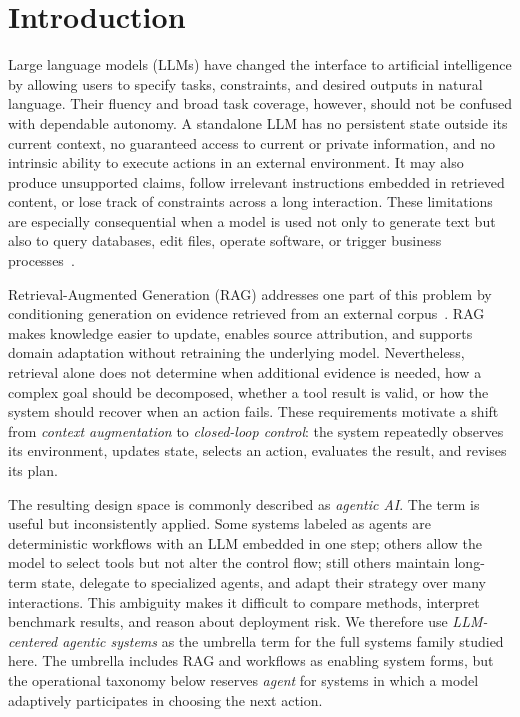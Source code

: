 \section{Introduction}
\label{sec:introduction}

Large language models (LLMs) have changed the interface to artificial intelligence by allowing users to specify tasks, constraints, and desired outputs in natural language. Their fluency and broad task coverage, however, should not be confused with dependable autonomy. A standalone LLM has no persistent state outside its current context, no guaranteed access to current or private information, and no intrinsic ability to execute actions in an external environment. It may also produce unsupported claims, follow irrelevant instructions embedded in retrieved content, or lose track of constraints across a long interaction. These limitations are especially consequential when a model is used not only to generate text but also to query databases, edit files, operate software, or trigger business processes~\cite{greshake2023promptinjection}.

Retrieval-Augmented Generation (RAG) addresses one part of this problem by conditioning generation on evidence retrieved from an external corpus~\cite{ghodratnama2024adapting,lewis2020rag,gao2023ragsurvey}. RAG makes knowledge easier to update, enables source attribution, and supports domain adaptation without retraining the underlying model. Nevertheless, retrieval alone does not determine when additional evidence is needed, how a complex goal should be decomposed, whether a tool result is valid, or how the system should recover when an action fails. These requirements motivate a shift from \emph{context augmentation} to \emph{closed-loop control}: the system repeatedly observes its environment, updates state, selects an action, evaluates the result, and revises its plan.

The resulting design space is commonly described as \emph{agentic AI}. The term is useful but inconsistently applied. Some systems labeled as agents are deterministic workflows with an LLM embedded in one step; others allow the model to select tools but not alter the control flow; still others maintain long-term state, delegate to specialized agents, and adapt their strategy over many interactions. This ambiguity makes it difficult to compare methods, interpret benchmark results, and reason about deployment risk. We therefore use \emph{LLM-centered agentic systems} as the umbrella term for the full systems family studied here. The umbrella includes RAG and workflows as enabling system forms, but the operational taxonomy below reserves \emph{agent} for systems in which a model adaptively participates in choosing the next action.

